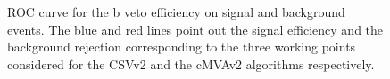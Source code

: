 \begin{figure}[!h]
\centering
{}
\caption{ROC curve for the b veto efficiency on signal and background events. The blue and red lines point out the signal efficiency and the background rejection corresponding to the three working points considered for the CSVv2 and the cMVAv2 algorithms
respectively.}\label{fig:btag}
\end{figure}






